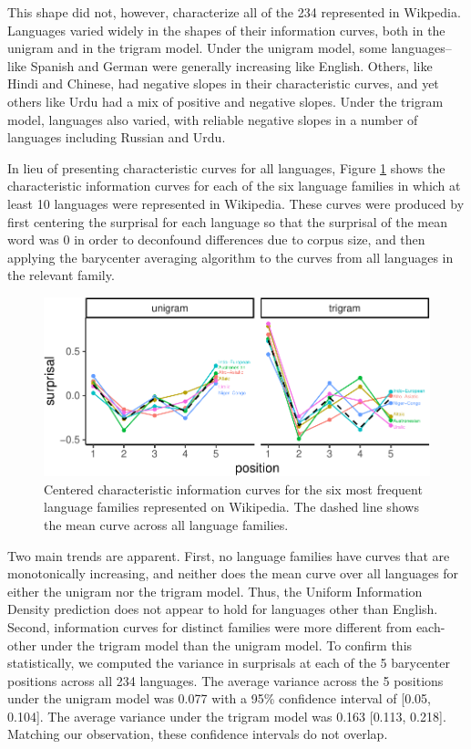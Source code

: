 \documentclass[entropy,article,submit,moreauthors,pdftex]{mdpi}
\begin{document}
This shape did not, however, characterize all of the 234 represented in
Wikpedia. Languages varied widely in the shapes of their information
curves, both in the unigram and in the trigram model. Under the unigram
model, some languages--like Spanish and German were generally increasing
like English. Others, like Hindi and Chinese, had negative slopes in
their characteristic curves, and yet others like Urdu had a mix of
positive and negative slopes. Under the trigram model, languages also
varied, with reliable negative slopes in a number of languages including
Russian and Urdu.

In lieu of presenting characteristic curves for all languages, Figure
\ref{fig:family-curves} shows the characteristic information curves for
each of the six language families in which at least 10 languages were
represented in Wikipedia. These curves were produced by first centering
the surprisal for each language so that the surprisal of the mean word
was 0 in order to deconfound differences due to corpus size, and then
applying the barycenter averaging algorithm to the curves from all
languages in the relevant family.

\begin{figure}[tb]

{\centering \includegraphics{figs/family-curves-1} 

}

\caption{Centered characteristic information curves for the six most frequent language families represented on Wikipedia. The dashed line shows the mean curve across all language families.}\label{fig:family-curves}
\end{figure}

Two main trends are apparent. First, no language families have curves
that are monotonically increasing, and neither does the mean curve over
all languages for either the unigram nor the trigram model. Thus, the
Uniform Information Density prediction does not appear to hold for
languages other than English. Second, information curves for distinct
families were more different from each-other under the trigram model
than the unigram model. To confirm this statistically, we computed the
variance in surprisals at each of the 5 barycenter positions across all
234 languages. The average variance across the 5 positions under the
unigram model was 0.077 with a 95\% confidence interval of {[}0.05,
0.104{]}. The average variance under the trigram model was 0.163
{[}0.113, 0.218{]}. Matching our observation, these confidence intervals
do not overlap.
\end{document}
